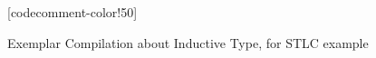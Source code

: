 \begin{figure}
\begin{minipage}{\textwidth}
\begin{multicols}{2}
[codecomment-color!50]

\end{multicols}
\end{minipage}

\caption{Exemplar Compilation about Inductive Type, for STLC example}\label{fig:plugin-example2}
\end{figure}